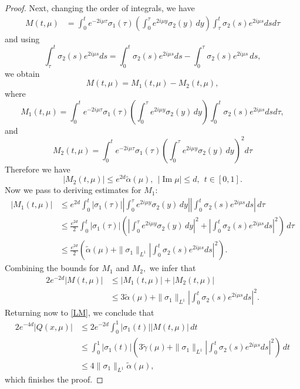 \documentclass[11pt]{amsart}
\theoremstyle{plain}
\theoremstyle{definition}
\theoremstyle{remark}
\numberwithin{equation}{section}
\renewcommand\Im{\operatorname{Im}}
\begin{document}
\begin{proof}
Next, changing the order of integrals, we have
\begin{align*}
M(t,\mu)
&=\int_0^t e^{-2i\mu\tau} \sigma_1(\tau)
\left(\int_0^\tau e^{2i\mu y}\sigma_2(y)\,dy\right)
\int_\tau^t\sigma_2(s)e^{2i\mu s}
ds d\tau
\end{align*}
and using
\[
\int_\tau^t\sigma_2(s) e^{2i\mu s}
ds =\int_0^t\sigma_2(s)e^{2i\mu s}
ds -\int_0^\tau\sigma_2(s)e^{2i\mu s}\,ds,
\]
we obtain
\[
M(t,\mu)=M_1(t,\mu)-M_2(t,\mu),
\]
where
\[
M_1(t,\mu)=\int_0^t e^{-2i\mu\tau} \sigma_1(\tau)
\left(\int_0^\tau e^{2i\mu y}\sigma_2(y)\,dy\right)
\int_0^t\sigma_2(s)e^{2i\mu s}
ds d\tau,
\]
and
\[M_2(t,\mu)=\int_0^t e^{-2i\mu\tau} \sigma_1(\tau)
\left(\int_0^\tau e^{2i\mu y}\sigma_2(y)\,dy\right)^2
d\tau
\]
Therefore we have
\[
|M_2(t,\mu)|\le e^{2d}\widetilde{\alpha}(\mu), \ \ |\Im \mu| \leq d, \ \  t\in [0,1].
\]
Now we pass to deriving estimates for  $M_1:$
\begin{align*}
|M_1(t,\mu)|&\le e^{2d}\int_0^t |\sigma_1(\tau)|
\left|\int_0^\tau e^{2i\mu y}\sigma_2(y)\,dy\right|
\left|\int_0^t\sigma_2(s)e^{2i\mu s}
ds\right|\, d\tau\\
&\le \frac{e^{2d}}{2}\int_0^t |\sigma_1(\tau)|\left(
\left|\int_0^\tau e^{2i\mu y}\sigma_2(y)\,dy\right|^2+
\left|\int_0^t\sigma_2(s)e^{2i\mu s}
ds\right|^2\right)\, d\tau\\
&\le \frac{e^{2d}}{2}\left(\widetilde{\alpha}(\mu)+\|\sigma_1\|_{L^1}
\left|\int_0^t\sigma_2(s)e^{2i\mu s}
ds\right|^2\right).
\end{align*}
Combining the bounds for $M_1$ and $M_2,$
we infer that
\begin{align*}
2 e^{-2d}|M(t,\mu)|&\le |M_1(t,\mu)|+|M_2(t,\mu)|\\
&\le 3\widetilde{\alpha}(\mu)+
 \|\sigma_1\|_{L^1}
\left|\int_0^t\sigma_2(s)e^{2i\mu s}
ds\right|^2.
\end{align*}
Returning now to \eqref{LM}, we conclude that
\begin{align*}
2 e^{-4d}|Q(x,\mu)|&\le 2 e^{-2d}\int_0^1 |\sigma_1(t)||M(t,\mu)|\,dt
\\
&\le\int_0^1|\sigma_1(t)|
\left(3\tilde{\gamma}(\mu)+\|\sigma_1\|_{L^1}
\left|\int_0^t\sigma_2(s)e^{2i\mu s}
ds\right|^2\right)\,dt
\\
&\le 4\|\sigma_1\|_{L^1}\widetilde{\alpha}(\mu),
\end{align*}
which finishes the proof.
\end{proof}




\end{document}
